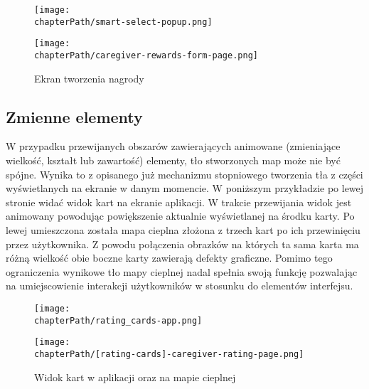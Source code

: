 \bigskip
\begin{figure}[H]
\centering
\begin{minipage}{.3\textwidth}
	\centering
	\texttt{[image: \\chapterPath/smart-select-popup.png]}
\end{minipage}
\begin{minipage}{.3\textwidth}
	\centering
	\texttt{[image: \\chapterPath/caregiver-rewards-form-page.png]}
\end{minipage}
\bigskip
\caption{Ekran tworzenia nagrody}
\label{fig:rs_reward_form}
\end{figure}

\subsection{Zmienne elementy}
W przypadku przewijanych obszarów zawierających animowane (zmieniające wielkość, kształt lub zawartość) elementy, tło stworzonych map może nie być spójne. Wynika to z opisanego już mechanizmu stopniowego tworzenia tła z części wyświetlanych na ekranie w danym momencie. W poniższym przykładzie po lewej stronie widać widok kart na ekranie aplikacji. W trakcie przewijania widok jest animowany powodując powiększenie aktualnie wyświetlanej na środku karty. Po lewej umieszczona została mapa cieplna złożona z trzech kart po ich przewinięciu przez użytkownika. Z powodu połączenia obrazków na których ta sama karta ma różną wielkość obie boczne karty zawierają defekty graficzne. Pomimo tego ograniczenia wynikowe tło mapy cieplnej nadal spełnia swoją funkcję pozwalając na umiejscowienie interakcji użytkowników w stosunku do elementów interfejsu.

\bigskip
\begin{figure}[H]
\begin{minipage}{.25\textwidth}
	\centering
	\texttt{[image: \\chapterPath/rating\_cards-app.png]}
\end{minipage}
\begin{minipage}{.74\textwidth}
	\centering
	\texttt{[image: \\chapterPath/[rating-cards]-caregiver-rating-page.png]}
\end{minipage}
\bigskip
\caption{Widok kart w aplikacji oraz na mapie cieplnej}
\label{fig:rs_rating_cards}
\end{figure}
